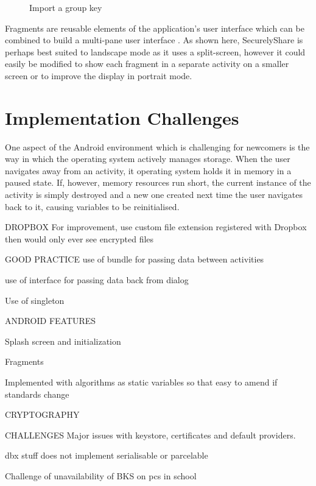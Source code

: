 \begin{figure}[h!]
                                                                                                                                                                                                           
    \caption{Import a group key }
    \label{fig:import}
\end{figure}

Fragments are reusable elements of the application's user interface which can be combined to build a multi-pane user interface \cite{androiddev3}. As shown here, SecurelyShare is perhaps  best suited to landscape mode as it uses a split-screen, however it could easily be modified to show each fragment in a separate activity on a smaller screen or to improve the display in portrait mode.



\section{Implementation Challenges}
One aspect of the Android environment which is challenging for newcomers is the way in which the operating system actively manages storage.  When the user navigates away from an activity, it operating system holds it in memory in a paused state.  If, however, memory resources run short, the current instance of the activity is simply destroyed and a new one created next time the user navigates back to it, causing variables to be reinitialised.


DROPBOX
For improvement, use custom file extension registered with Dropbox then would only ever see encrypted files

GOOD PRACTICE
use of bundle for passing data between activities

use of interface for passing data back from dialog

Use of singleton



ANDROID FEATURES

Splash screen and initialization

Fragments

Implemented with algorithms as static variables so that easy to amend if standards change

CRYPTOGRAPHY




CHALLENGES
Major issues with keystore, certificates and default providers.

dbx stuff does not implement serialisable or parcelable


Challenge of unavailability of BKS on pcs in school

